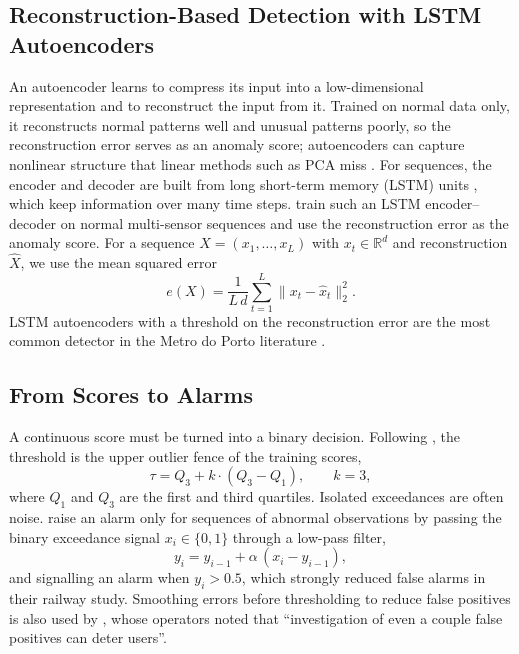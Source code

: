 \subsection{Reconstruction-Based Detection with LSTM Autoencoders}
An autoencoder learns to compress its input into a low-dimensional representation and to reconstruct the input from it. Trained on normal data only, it reconstructs normal patterns well and unusual patterns poorly, so the reconstruction error serves as an anomaly score; autoencoders can capture nonlinear structure that linear methods such as PCA miss \citep{sakurada2014autoencoders}. For sequences, the encoder and decoder are built from long short-term memory (LSTM) units \citep{hochreiter1997lstm}, which keep information over many time steps. \citet{malhotra2016lstm} train such an LSTM encoder--decoder on normal multi-sensor sequences and use the reconstruction error as the anomaly score. For a sequence $X=(x_1,\dots,x_L)$ with $x_t\in\mathbb{R}^d$ and reconstruction $\hat{X}$, we use the mean squared error
\begin{equation}
e(X) = \frac{1}{L\,d}\sum_{t=1}^{L}\lVert x_t - \hat{x}_t\rVert_2^2 .
\label{eq:recon}
\end{equation}
LSTM autoencoders with a threshold on the reconstruction error are the most common detector in the Metro do Porto literature \citep{silva2023adversarial,gama2024neurosymbolic,davari2024explaining}.

\subsection{From Scores to Alarms}
A continuous score must be turned into a binary decision. Following \citet{silva2023adversarial}, the threshold is the upper outlier fence of the training scores,
\begin{equation}
\tau = Q_3 + k\cdot(Q_3 - Q_1), \qquad k=3,
\label{eq:iqr}
\end{equation}
where $Q_1$ and $Q_3$ are the first and third quartiles. Isolated exceedances are often noise. \citet{ribeiro2016sequential} raise an alarm only for sequences of abnormal observations by passing the binary exceedance signal $x_i\in\{0,1\}$ through a low-pass filter,
\begin{equation}
y_i = y_{i-1} + \alpha\,(x_i - y_{i-1}),
\label{eq:lowpass}
\end{equation}
and signalling an alarm when $y_i > 0.5$, which strongly reduced false alarms in their railway study. Smoothing errors before thresholding to reduce false positives is also used by \citet{hundman2018detecting}, whose operators noted that ``investigation of even a couple false positives can deter users''.

